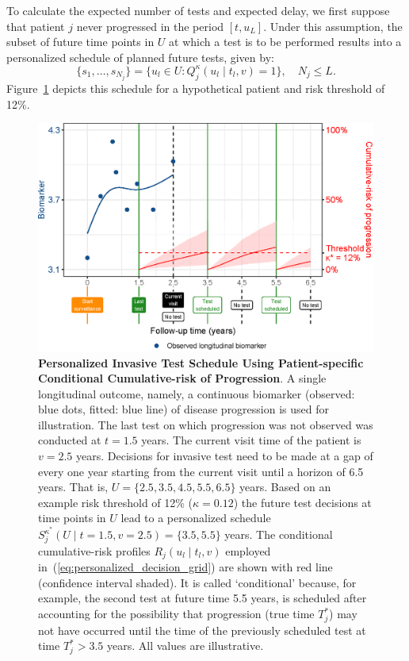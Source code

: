 To calculate the expected number of tests and expected delay, we first suppose that patient $j$ never progressed in the period $[t, u_L]$. Under this assumption, the subset of future time points in $U$ at which a test is to be performed results into a personalized schedule of planned future tests, given by:
\begin{equation}
\label{eq:personalized_schedule_grid}
\{s_1, \ldots, s_{N_j}\} = \big\{ u_l \in U : Q_j^\kappa(u_l \mid t_l, v) = 1 \big\}, \quad N_j \leq L.
\end{equation}
Figure~\ref{fig:schedule_explanation} depicts this schedule for a hypothetical patient and risk threshold of 12\%.
\begin{figure}
\centerline{\includegraphics{images/schedule_explanation_102.eps}}
\caption{\textbf{Personalized Invasive Test Schedule Using Patient-specific Conditional Cumulative-risk of Progression}.  A single longitudinal outcome, namely, a continuous biomarker (observed: blue dots, fitted: blue line) of disease progression is used for illustration. The last test on which progression was not observed was conducted at $t=1.5$ years. The current visit time of the patient is $v=2.5$ years. Decisions for invasive test need to be made at a gap of every one year starting from the current visit until a horizon of 6.5 years. That is, $U=\{2.5, 3.5, 4.5, 5.5, 6.5\}$ years. Based on an example risk threshold of 12\% ($\kappa=0.12$) the future test decisions at time points in $U$ lead to a personalized schedule $S_j^{\kappa^*} (U \mid t=1.5, v=2.5) = \{3.5, 5.5\}$ years. The conditional cumulative-risk profiles $R_j(u_l \mid t_l, v)$ employed in~(\ref{eq:personalized_decision_grid}) are shown with red line (confidence interval shaded). It is called `conditional' because, for example, the second test at future time 5.5 years, is scheduled after accounting for the possibility that progression (true time $T^*_j$) may not have occurred until the time of the previously scheduled test at time $T^*_j>3.5$ years. All values are illustrative.} 
\label{fig:schedule_explanation}
\end{figure}
